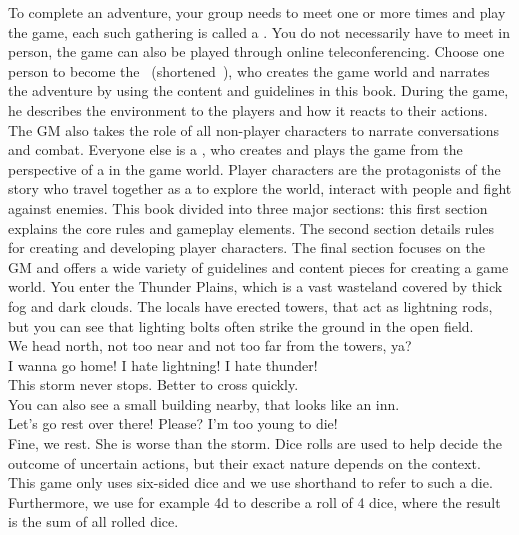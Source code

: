 To complete an adventure, your group needs to meet one or more times and play the game, each such gathering is called a .
You do not necessarily have to meet in person, the game can also be played through online teleconferencing.
%
\ofpar
%
Choose one person to become the ~(shortened~), who creates the game world and narrates the adventure by using the content and guidelines in this book.
During the game, he describes the environment to the players and how it reacts to their actions. 
The GM also takes the role of all non-player characters to narrate conversations and combat. 
Everyone else is a , who creates and plays the game from the perspective of a  in the game world.
Player characters are the protagonists of the story who travel together as a  to explore the world, interact with people and fight against enemies. 
This book divided into three major sections: this first section explains the core rules and gameplay elements.
The second section details rules for creating and developing player characters.
The final section focuses on the GM and offers a wide variety of guidelines and content pieces for creating a game world. 
%
\vfill
%
{
	\newcommand{\nl}{\vspace{0.2cm}\\}
	 You enter the Thunder Plains, which is a vast wasteland covered by thick fog and dark clouds.
	The locals have erected towers, that act as lightning rods, but you can see that lighting bolts often strike the ground in the open field.\nl
	 We head north, not too near and not too far from the towers, ya?\nl
	 I wanna go home! I hate lightning! I hate thunder!\nl
	 This storm never stops. Better to cross quickly.\nl
	 You can also see a small building nearby, that looks like an inn.\nl
	 Let’s go rest over there! Please? I'm too young to die!\nl
	 Fine, we rest. She is worse than the storm.
}
%
\vfill
%
Dice rolls are used to help decide the outcome of uncertain actions, but their exact nature depends on the context. 
This game only uses six-sided dice and we use  shorthand to refer to such a die.
Furthermore, we use for example 4d to describe a roll of 4 dice, where the result is the sum of all rolled dice.
